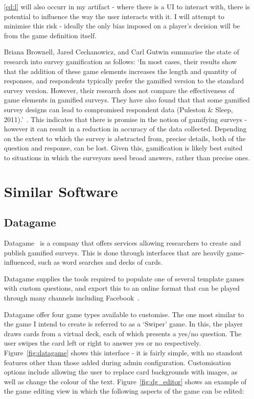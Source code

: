 \ref{cd:l} will also occurr in my artifact - where there is a UI to interact with, there is potential to influence the way the user interacts with it. I will attempt to minimise this risk - ideally the only bias imposed on a player's decision will be from the game definition itself.

Briana Brownell, Jared Cechanowicz, and Carl Gutwin summarise the state of research into survey gamification as follows:
`In most cases, their results show that the addition of these game elements increases the length and quantity of responses, and respondents typically prefer the gamified version to the standard survey version. However, their research does not compare the effectiveness of game elements in gamified surveys. They have also found that that some gamified survey designs can lead to compromised respondent data (Puleston \& Sleep, 2011).'~\cite{SurveyGamificationResearch}.
This indicates that there is promise in the notion of gamifying surveys - however it can result in a reduction in accuracy of the data collected. Depending on the extent to which the survey is abstracted from, precise details, both of the question and response, can be lost. Given this, gamification is likely best suited to situations in which the surveyors need broad answers, rather than precise ones.

\section{Similar Software}

\subsection{Datagame}
Datagame~\cite{Datagame} is a company that offers services allowing researchers to create and publish gamified surveys. This is done through interfaces that are heavily game-influenced, such as word searches and decks of cards.

Datagame supplies the tools required to populate one of several template games with custom questions, and export this to an online format that can be played through many channels including Facebook~\cite{Facebook}. 

Datagame offer four game types available to customise. The one most similar to the game I intend to create is referred to as a `Swiper' game. In this, the player draws cards from a virtual deck, each of which presents a yes/no question. The user swipes the card left or right to answer yes or no respectively. Figure~\ref{fig:datagame} shows this interface - it is fairly simple, with no standout features other than those added during admin configuration. Customisation options include allowing the user to replace card backgrounds with images, as well as change the colour of the text. Figure~\ref{fig:dg_editor} shows an example of the game editing view in which the following aspects of the game can be edited:

